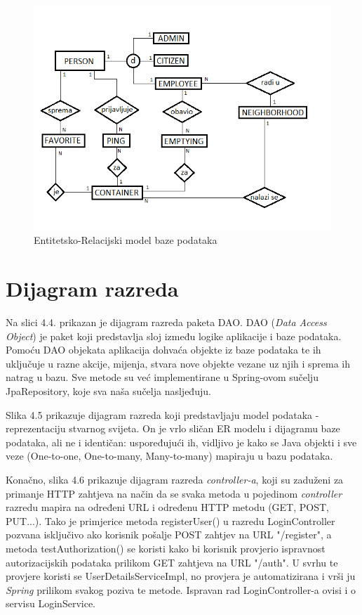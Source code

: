 				\begin{figure}[H]
					\includegraphics[scale=0.8]{figures/er_model.PNG}
					\centering
					\caption{Entitetsko-Relacijski model baze podataka}
					\label{fig:er-model}
				\end{figure}
			
			\eject
			
			
		\section{Dijagram razreda}
		
			Na slici 4.4. prikazan je dijagram razreda paketa DAO. DAO (\textit{Data Access Object}) je paket koji predstavlja sloj između logike aplikacije i baze podataka. Pomoću DAO objekata aplikacija dohvaća objekte iz baze podataka te ih uključuje u razne akcije, mijenja, stvara nove objekte vezane uz njih i sprema ih natrag u bazu. Sve metode su već implementirane u Spring-ovom sučelju JpaRepository, koje sva naša sučelja nasljeđuju.
			
			Slika 4.5 prikazuje dijagram razreda koji predstavljaju model podataka - reprezentaciju stvarnog svijeta. On je vrlo sličan ER modelu i dijagramu baze podataka, ali ne i identičan: uspoređujući ih, vidljivo je kako se Java objekti i sve veze (One-to-one, One-to-many, Many-to-many) mapiraju u bazu podataka.
			
			Konačno, slika 4.6 prikazuje dijagram razreda \textit{controller-a}, koji su zaduženi za primanje HTTP zahtjeva na način da se svaka metoda u pojedinom \textit{controller} razredu mapira na određeni URL i određenu HTTP metodu (GET, POST, PUT...). Tako je primjerice metoda registerUser() u razredu LoginController pozvana isključivo ako korisnik pošalje POST zahtjev na URL "/register", a metoda testAuthorization() se koristi kako bi korisnik provjerio ispravnost autorizacijskih podataka prilikom GET zahtjeva na URL "/auth". U svrhu te provjere koristi se UserDetailsServiceImpl, no provjera je automatizirana i vrši ju \textit{Spring} prilikom svakog poziva te metode. Ispravan rad LoginController-a ovisi i o servisu LoginService.
			
